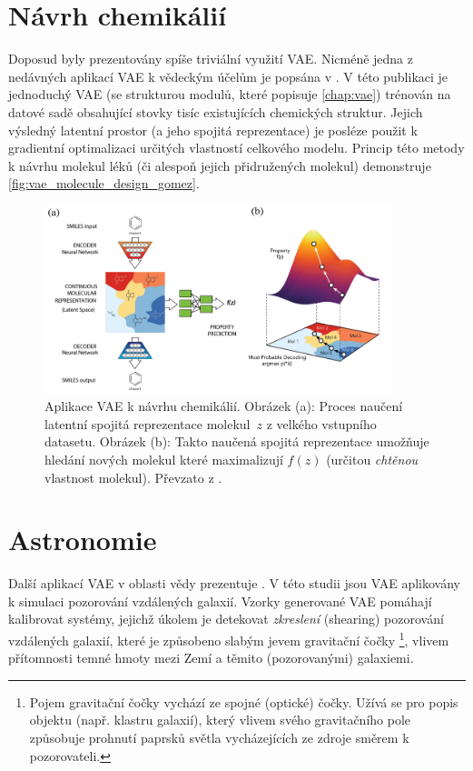 \newpage
\section{Návrh chemikálií}
Doposud byly prezentovány spíše triviální využití VAE.
Nicméně jedna z nedávných aplikací VAE k vědeckým účelům je popsána v \cite{GomezBombarelli2018}.
V této publikaci je jednoduchý VAE (se strukturou modulů, které popisuje \autoref{chap:vae}) trénován na datové sadě obsahující stovky tisíc existujících chemických struktur.
Jejich výsledný latentní prostor (a jeho spojitá reprezentace) je posléze použit k gradientní optimalizaci určitých vlastností celkového modelu.
Princip této metody k návrhu molekul léků (či alespoň jejich přidružených molekul) demonstruje \autoref{fig:vae_molecule_design_gomez}. \cite{Kingma2019}

\begin{figure}[H]
    \centering
    \includegraphics[width=0.9\textwidth]{figures/applications/vae_molecule_design_gomez.png}
    \caption{Aplikace VAE k návrhu chemikálií. Obrázek (a): Proces naučení latentní spojitá reprezentace molekul $z$ z velkého vstupního datasetu. Obrázek (b): Takto naučená spojitá reprezentace umožňuje hledání nových molekul které maximalizují $f(z)$ (určitou \emph{chtěnou} vlastnost molekul). Převzato z \cite{GomezBombarelli2018}.}
    \label{fig:vae_molecule_design_gomez}
\end{figure}

\newpage
\section{Astronomie}
Další aplikací VAE v oblasti vědy prezentuje \cite{Ravanbakhsh2016}.
V této studii jsou VAE aplikovány k simulaci pozorování vzdálených galaxií.
Vzorky generované VAE pomáhají kalibrovat systémy, jejichž úkolem je detekovat \emph{zkreslení} (shearing) pozorování vzdálených galaxií, které je způsobeno slabým jevem gravitační čočky
\footnote{Pojem gravitační čočky vychází ze spojné (optické) čočky. Užívá se pro popis objektu (např. klastru galaxií), který vlivem svého gravitačního pole způsobuje prohnutí paprsků světla vycházejících ze zdroje směrem k pozorovateli.},
vlivem přítomnosti temné hmoty mezi Zemí a těmito (pozorovanými) galaxiemi. \cite{Kingma2019}

